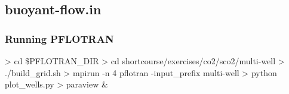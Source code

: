 \documentclass{beamer}
\begin{document}
\subsection{buoyant-flow.in}

\begin{frame}[fragile]\frametitle{Running PFLOTRAN}

\begin{semiverbatim}

> cd \$PFLOTRAN_DIR
> cd shortcourse/exercises/co2/sco2/multi-well
> ./build_grid.sh
> mpirun -n 4 pflotran -input_prefix multi-well
> python plot_wells.py
> paraview \&

\end{semiverbatim}

\end{frame}
\end{document}
